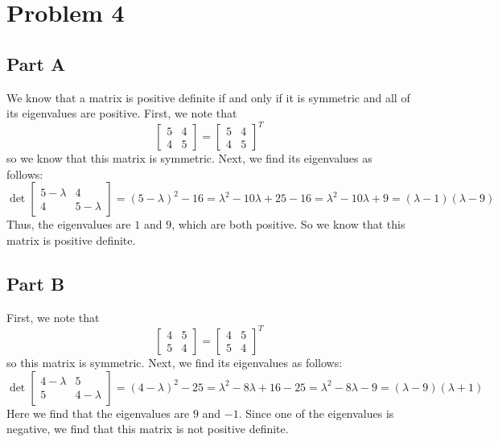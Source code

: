 \documentclass[12pt]{article}
\begin{document}
\section*{Problem 4}
\subsection*{Part A}
We know that a matrix is positive definite if and only if it is symmetric and all of its eigenvalues are positive. First, we note that
\[
\begin{bmatrix}
5 & 4\\
4 & 5
\end{bmatrix}
=
\begin{bmatrix}
5 & 4\\
4 & 5
\end{bmatrix}^T
\] so we know that this matrix is symmetric. Next, we find its eigenvalues as follows:
\[
\det \begin{bmatrix}
5 - \lambda & 4\\
4 & 5 - \lambda 
\end{bmatrix}
=
(5 - \lambda)^2 - 16 = \lambda^2 - 10\lambda + 25 - 16 = \lambda^2 - 10\lambda + 9 = (\lambda-1)(\lambda-9)
\] Thus, the eigenvalues are $1$ and $9$, which are both positive. So we know that this matrix is positive definite.
\newpage
\subsection*{Part B}
First, we note that
\[
\begin{bmatrix}
4 & 5\\
5 & 4
\end{bmatrix} = 
\begin{bmatrix}
4 & 5\\
5 & 4
\end{bmatrix}^T
\] so this matrix is symmetric. Next, we find its eigenvalues as follows:
\[
\det \begin{bmatrix}
4 - \lambda & 5\\
5 & 4 - \lambda
\end{bmatrix} = 
(4 - \lambda)^2 - 25 = \lambda^2 - 8\lambda + 16 - 25 = \lambda^2 - 8\lambda -9 = (\lambda - 9)(\lambda + 1)
\] Here we find that the eigenvalues are $9$ and $-1$. Since one of the eigenvalues is negative, we find that this matrix is not positive definite.
\newpage
\end{document}
